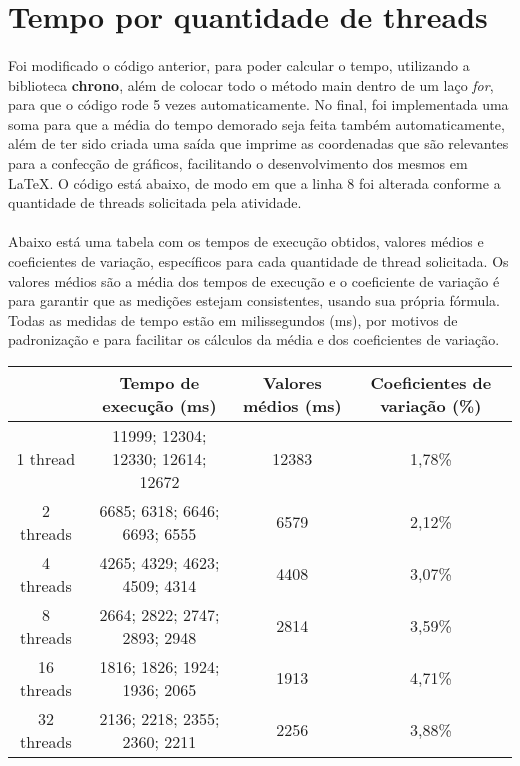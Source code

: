 \documentclass{article}
\begin{document}


\section{Tempo por quantidade de threads}
\paragraph{}Foi modificado o código anterior, para poder calcular o tempo, utilizando a biblioteca \textbf{chrono}, além de colocar todo o método main dentro de um laço \textit{for}, para que o código rode 5 vezes automaticamente. No final, foi implementada uma soma para que a média do tempo demorado seja feita também automaticamente, além de ter sido criada uma saída que imprime as coordenadas que são relevantes para a confecção de gráficos, facilitando o desenvolvimento dos mesmos em \LaTeX. O código está abaixo, de modo em que a linha 8 foi alterada conforme a quantidade de threads solicitada pela atividade.



\paragraph{}Abaixo está uma tabela com os tempos de execução obtidos, valores médios e coeficientes de variação, específicos para cada quantidade de thread solicitada. Os valores médios são a média dos tempos de execução e o coeficiente de variação é para garantir que as medições estejam consistentes, usando sua própria fórmula. Todas as medidas de tempo estão em milissegundos (ms), por motivos de padronização e para facilitar os cálculos da média e dos coeficientes de variação.
\begin{center}
\begin{tabular}{|c|c|c|c|}
\hline
 & Tempo de execução (ms) & Valores médios (ms) & Coeficientes de variação (\%) \\ \hline
1 thread & 11999; 12304; 12330; 12614; 12672 & 12383 & 1,78\% \\ \hline
2 threads & 6685; 6318; 6646; 6693; 6555 & 6579 & 2,12\% \\ \hline
4 threads & 4265; 4329; 4623; 4509; 4314 & 4408 & 3,07\% \\ \hline
8 threads & 2664; 2822; 2747; 2893; 2948 & 2814 & 3,59\% \\ \hline
16 threads & 1816; 1826; 1924; 1936; 2065 & 1913 & 4,71\% \\ \hline
32 threads & 2136; 2218; 2355; 2360; 2211 & 2256 & 3,88\% \\ \hline
\end{tabular}
\end{center}
\end{document}
